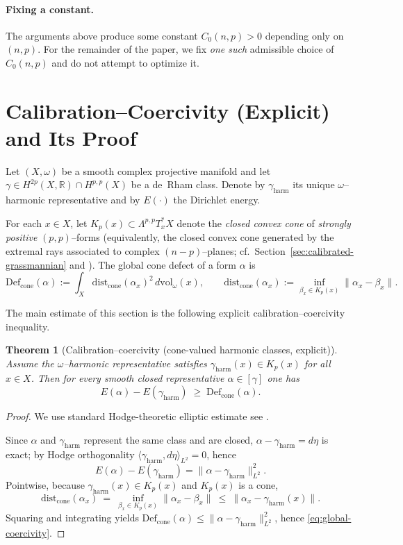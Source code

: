 \documentclass[11pt]{article}
\newcommand{\REV}[1]{\textcolor{blue}{#1}}
\newcommand{\REVMZ}[1]{\textcolor{teal}{#1}}  %
\numberwithin{equation}{section}  %
\theoremstyle{plain}
\newtheorem{theorem}{Theorem}[section]
\theoremstyle{definition}
\theoremstyle{remark}
\newcommand{\R}{\mathbb{R}}
\newcommand{\dist}{\mathrm{dist}}
\newcommand{\harm}{\mathrm{harm}}
\newcommand{\gharm}{\gamma_{\harm}}
\newcommand{\Def}{\mathrm{Def}}
\newcommand{\cone}{\mathrm{cone}}
\newcommand{\Defcone}{\Def_{\cone}}          %
\newcommand{\distcone}{\dist_{\cone}}        %
\begin{document}
\paragraph{Fixing a constant.}

The arguments above produce some constant $C_{0}(n,p)>0$ depending only on $(n,p)$.
For the remainder of the paper, we fix \emph{one such} admissible choice of $C_{0}(n,p)$
and do not attempt to optimize it.


\section{Calibration--Coercivity (Explicit) and Its Proof}
\label{sec:cal-coercivity}

Let $(X,\omega)$ be a smooth complex projective manifold and let
$\gamma\in H^{2p}(X,\R)\cap H^{p,p}(X)$ be a de~Rham class.
Denote by $\gharm$ its unique $\omega$--harmonic representative \REVMZ{\cite{Wells,Voisin02}} and by
$E(\cdot)$ the Dirichlet energy.

For each $x\in X$, let $K_p(x)\subset \Lambda^{p,p}T_x^*X$ denote the \emph{closed convex cone} of \emph{strongly positive} $(p,p)$--forms
(equivalently, the closed convex cone generated by the extremal rays associated to complex $(n-p)$--planes; cf.\ Section~\ref{sec:calibrated-grassmannian} and \REVMZ{\cite{HL82}}).
The global cone defect of a form $\alpha$ is
\[
\Defcone(\alpha)
:= \int_X \distcone(\alpha_x)^2\,d\mathrm{vol}_\omega(x),
\qquad
\distcone(\alpha_x)
:= \inf_{\beta_x\in K_p(x)} \|\alpha_x - \beta_x\|.
\]

The main estimate of this section is the following explicit calibration--coercivity inequality.

\begin{theorem}[Calibration--coercivity (cone-valued harmonic classes, explicit)]
	\label{thm:cal-coercivity}
	Assume the $\omega$--harmonic representative satisfies $\gharm(x)\in K_p(x)$ for all $x\in X$.
	Then for every smooth closed representative $\alpha\in[\gamma]$ one has
	\begin{equation}\label{eq:global-coercivity}
		E(\alpha)-E(\gharm) \;\ge\; \Defcone(\alpha).
	\end{equation}
\end{theorem}

\begin{proof}
We use standard Hodge-theoretic elliptic estimate
see \REV{\cite{Wells}}.

Since $\alpha$ and $\gharm$ represent the same class and are closed, $\alpha-\gharm=d\eta$ is exact; by Hodge orthogonality
$\langle \gharm, d\eta\rangle_{L^2}=0$, hence
\[
E(\alpha)-E(\gharm)=\|\alpha-\gharm\|_{L^2}^2.
\]
Pointwise, because $\gharm(x)\in K_p(x)$ and $K_p(x)$ is a cone,
\[
\distcone(\alpha_x)\ =\ \inf_{\beta_x\in K_p(x)}\|\alpha_x-\beta_x\|
\ \le\ \|\alpha_x-\gharm(x)\|.
\]
Squaring and integrating yields $\Defcone(\alpha)\le \|\alpha-\gharm\|_{L^2}^2$, hence \eqref{eq:global-coercivity}.
\end{proof}
\end{document}
